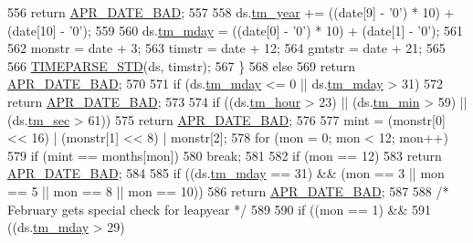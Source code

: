 \begin{DoxyCode}
556             \textcolor{keywordflow}{return} \hyperlink{group__APR__Util__Date_ga8be88b25f4b477ad13c4067c959411b0}{APR\_DATE\_BAD};
557 
558         ds.\hyperlink{structapr__time__exp__t_a35c32245be49279a6689e34bcd6e534a}{tm\_year} += ((date[9] - \textcolor{charliteral}{'0'}) * 10) + (date[10] - \textcolor{charliteral}{'0'});
559 
560         ds.\hyperlink{structapr__time__exp__t_a6c09a274f011841e9e988c3c9504848a}{tm\_mday} = ((date[0] - \textcolor{charliteral}{'0'}) * 10) + (date[1] - \textcolor{charliteral}{'0'});
561 
562         monstr = date + 3;
563         timstr = date + 12;
564         gmtstr = date + 21;
565 
566         \hyperlink{apr__date_8c_a574f7cc7ba24c017bff5d6c41cf5903d}{TIMEPARSE\_STD}(ds, timstr);
567     \}
568     \textcolor{keywordflow}{else}
569         \textcolor{keywordflow}{return} \hyperlink{group__APR__Util__Date_ga8be88b25f4b477ad13c4067c959411b0}{APR\_DATE\_BAD};
570 
571     \textcolor{keywordflow}{if} (ds.\hyperlink{structapr__time__exp__t_a6c09a274f011841e9e988c3c9504848a}{tm\_mday} <= 0 || ds.\hyperlink{structapr__time__exp__t_a6c09a274f011841e9e988c3c9504848a}{tm\_mday} > 31)
572         \textcolor{keywordflow}{return} \hyperlink{group__APR__Util__Date_ga8be88b25f4b477ad13c4067c959411b0}{APR\_DATE\_BAD};
573 
574     \textcolor{keywordflow}{if} ((ds.\hyperlink{structapr__time__exp__t_a2dbab1d10ed6234c8e9e714e13b7911c}{tm\_hour} > 23) || (ds.\hyperlink{structapr__time__exp__t_a56a380db482ba5b2bef43351faad27fb}{tm\_min} > 59) || (ds.\hyperlink{structapr__time__exp__t_a2c29c99a75b55237917cb05ebae6706c}{tm\_sec} > 61)) 
575         \textcolor{keywordflow}{return} \hyperlink{group__APR__Util__Date_ga8be88b25f4b477ad13c4067c959411b0}{APR\_DATE\_BAD};
576 
577     mint = (monstr[0] << 16) | (monstr[1] << 8) | monstr[2];
578     \textcolor{keywordflow}{for} (mon = 0; mon < 12; mon++)
579         \textcolor{keywordflow}{if} (mint == months[mon])
580             \textcolor{keywordflow}{break};
581 
582     \textcolor{keywordflow}{if} (mon == 12)
583         \textcolor{keywordflow}{return} \hyperlink{group__APR__Util__Date_ga8be88b25f4b477ad13c4067c959411b0}{APR\_DATE\_BAD};
584 
585     \textcolor{keywordflow}{if} ((ds.\hyperlink{structapr__time__exp__t_a6c09a274f011841e9e988c3c9504848a}{tm\_mday} == 31) && (mon == 3 || mon == 5 || mon == 8 || mon == 10))
586         \textcolor{keywordflow}{return} \hyperlink{group__APR__Util__Date_ga8be88b25f4b477ad13c4067c959411b0}{APR\_DATE\_BAD};
587 
588     \textcolor{comment}{/* February gets special check for leapyear */}
589 
590     \textcolor{keywordflow}{if} ((mon == 1) &&
591         ((ds.\hyperlink{structapr__time__exp__t_a6c09a274f011841e9e988c3c9504848a}{tm\_mday} > 29)

\end{DoxyCode}
